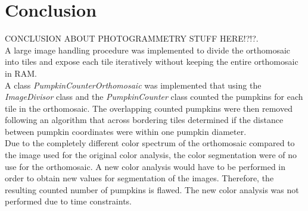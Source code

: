 \documentclass[../Head/Main.tex]{subfiles}
\begin{document}
\section{Conclusion}
CONCLUSION ABOUT PHOTOGRAMMETRY STUFF HERE!?!?.\\

A large image handling procedure was implemented to divide the orthomosaic into tiles and expose each tile iteratively without keeping the entire orthomosaic in RAM.\\
A class \textit{PumpkinCounterOrthomosaic} was implemented that using the \textit{ImageDivisor} class and the \textit{PumpkinCounter} class counted the pumpkins for each tile in the orthomosaic. The overlapping counted pumpkins were then removed following an algorithm that across bordering tiles determined if the distance between pumpkin coordinates were within one pumpkin diameter.\\
Due to the completely different color spectrum of the orthomosaic compared to the image used for the original color analysis, the color segmentation were of no use for the orthomosaic. A new color analysis would have to be performed in order to obtain new values for segmentation of the images. Therefore, the resulting counted number of pumpkins is flawed. The new color analysis was not performed due to time constraints.
\end{document}
